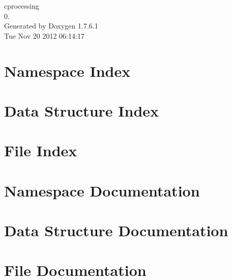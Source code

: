 \documentclass[a4paper]{book}
\begin{document}
\hypersetup{pageanchor=false,citecolor=blue}
\begin{titlepage}
\vspace*{7cm}
\begin{center}
{\Large cprocessing \\[1ex]\large 0. }\\
\vspace*{1cm}
{\large \-Generated by Doxygen 1.7.6.1}\\
\vspace*{0.5cm}
{\small Tue Nov 20 2012 06:14:17}\\
\end{center}
\end{titlepage}
\clearemptydoublepage
{}
\tableofcontents
\clearemptydoublepage
{}
\hypersetup{pageanchor=true,citecolor=blue}
\chapter{\-Namespace \-Index}

\chapter{\-Data \-Structure \-Index}

\chapter{\-File \-Index}

\chapter{\-Namespace \-Documentation}

\chapter{\-Data \-Structure \-Documentation}










\chapter{\-File \-Documentation}

























\printindex
\end{document}
